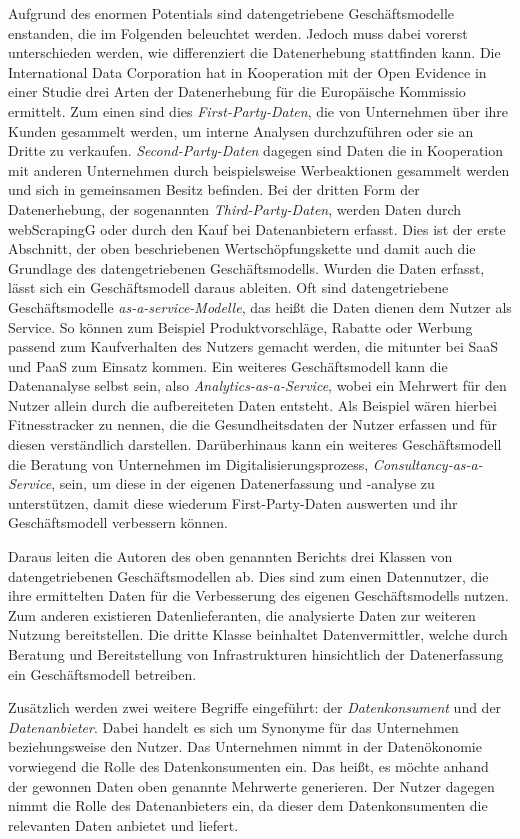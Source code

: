 \noindent Aufgrund des enormen Potentials sind datengetriebene Geschäftsmodelle enstanden, die im Folgenden beleuchtet werden. Jedoch muss dabei vorerst unterschieden werden, wie differenziert die Datenerhebung stattfinden kann. Die International Data Corporation hat in Kooperation mit der Open Evidence in einer Studie drei Arten der Datenerhebung für die Europäische Kommissio ermittelt. Zum einen sind dies \textit{First-Party-Daten}, die von Unternehmen über ihre Kunden gesammelt werden, um interne Analysen durchzuführen oder sie an Dritte zu verkaufen. \textit{Second-Party-Daten} dagegen sind Daten die in Kooperation mit anderen Unternehmen durch beispielsweise Werbeaktionen gesammelt werden und sich in gemeinsamen Besitz befinden. Bei der dritten Form der Datenerhebung, der sogenannten \textit{Third-Party-Daten}, werden Daten durch \gls{webScrapingG} oder durch den Kauf bei Datenanbietern erfasst. Dies ist der erste Abschnitt, der oben beschriebenen Wertschöpfungskette und damit auch die Grundlage des datengetriebenen Geschäftsmodells. Wurden die Daten erfasst, lässt sich ein Geschäftsmodell daraus ableiten. Oft sind datengetriebene Geschäftsmodelle \textit{\glqq as-a-service\grqq{}-Modelle}, das heißt die Daten dienen dem Nutzer als Service. So können zum Beispiel Produktvorschläge, Rabatte oder Werbung passend zum Kaufverhalten des Nutzers gemacht werden, die mitunter bei \gls{SaaS} und \gls{PaaS} zum Einsatz kommen. Ein weiteres Geschäftsmodell kann die Datenanalyse selbst sein, also \textit{Analytics-as-a-Service}, wobei ein Mehrwert für den Nutzer allein durch die aufbereiteten Daten entsteht. Als Beispiel wären hierbei Fitnesstracker zu nennen, die die Gesundheitsdaten der Nutzer erfassen und für diesen verständlich darstellen. Darüberhinaus kann ein weiteres Geschäftsmodell die Beratung von Unternehmen im Digitalisierungsprozess, \textit{Consultancy-as-a-Service}, sein, um diese in der eigenen Datenerfassung und -analyse zu unterstützen, damit diese wiederum First-Party-Daten auswerten und ihr Geschäftsmodell verbessern können. \newline

\noindent Daraus leiten die Autoren des oben genannten Berichts drei Klassen von datengetriebenen Geschäftsmodellen ab. Dies sind zum einen Datennutzer, die ihre ermittelten Daten für die Verbesserung des eigenen Geschäftsmodells nutzen. Zum anderen existieren Datenlieferanten, die analysierte Daten zur weiteren Nutzung bereitstellen. Die dritte Klasse beinhaltet Datenvermittler, welche durch Beratung und Bereitstellung von Infrastrukturen hinsichtlich der Datenerfassung ein Geschäftsmodell betreiben. \cite{smart_2013} \newline

\noindent Zusätzlich werden zwei weitere Begriffe eingeführt: der \textit{Datenkonsument} und der \textit{Datenanbieter}. Dabei handelt es sich um Synonyme für das Unternehmen beziehungsweise den Nutzer. Das Unternehmen nimmt in der Datenökonomie vorwiegend die Rolle des Datenkonsumenten ein. Das heißt, es möchte anhand der gewonnen Daten oben genannte Mehrwerte generieren. Der Nutzer dagegen nimmt die Rolle des Datenanbieters ein, da dieser dem Datenkonsumenten die relevanten Daten anbietet und liefert. 